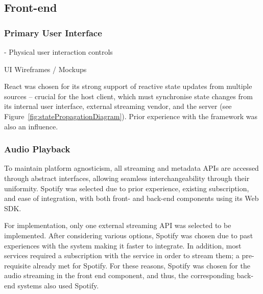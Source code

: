         
        \subsection{Front-end}
            \subsubsection{Primary User Interface}
    
                \begin{temp}
                    - Physical user interaction controls
                \end{temp}
    
                \begin{temp}
                    UI Wireframes / Mockups
                \end{temp}
    
                React was chosen for its strong support of reactive state updates from multiple sources -- crucial for the host client, which must synchronise state changes from its internal user interface, external streaming vendor, and the server (see Figure~\ref{fig:statePropagationDiagram}). Prior experience with the framework was also an influence.
            
            \subsubsection{Audio Playback}
    
                To maintain platform agnosticism, all streaming and metadata APIs are accessed through abstract interfaces, allowing seamless interchangeability through their uniformity. Spotify was selected due to prior experience, existing subscription, and ease of integration, with both front- and back-end components using its Web SDK.
    
                For implementation, only one external streaming API was selected to be implemented. After considering various options, Spotify was chosen due to past experiences with the system making it faster to integrate. In addition, most services required a subscription with the service in order to stream them; a pre-requisite already met for Spotify. For these reasons, Spotify was chosen for the audio streaming in the front end component, and thus, the corresponding back-end systems also used Spotify.
    
